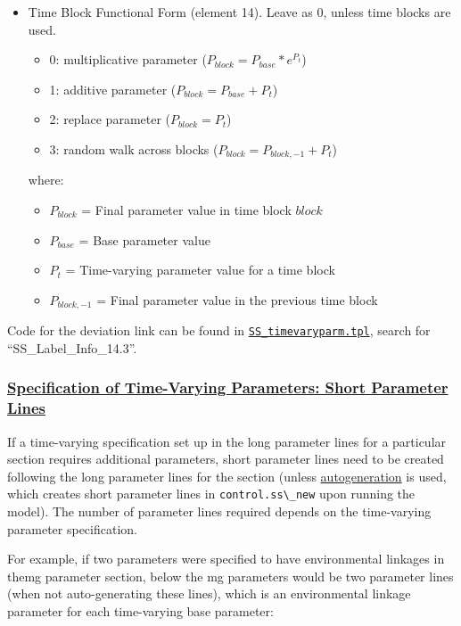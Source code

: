 \begin{itemize}
\item Time Block Functional Form (element 14). Leave as 0, unless time blocks are used.
	\begin{itemize}
		\item 0: multiplicative parameter ($P_{block} = P_{base}*e^{P_t}$)
		\item 1: additive parameter ($P_{block} = P_{base} + P_t$)
		\item 2: replace parameter ($P_{block} = P_t$)
		\item 3: random walk across blocks ($P_{block} = P_{block,-1} + P_t$)
	\end{itemize}
	where:
	\begin{itemize}
        \item $P_{block}$ = Final parameter value in time block $block$
        \item $P_{base}$ = Base parameter value
		\item $P_{t}$ = Time-varying parameter value for a time block
		\item $P_{block,-1}$ = Final parameter value in the previous time block
     \end{itemize}
\end{itemize}


Code for the deviation link can be found in \href{https://github.com/nmfs-ost/ss3-source-code/blob/main/SS_timevaryparm.tpl}{\texttt{SS\_timevaryparm.tpl}}, search for ``SS\_Label\_Info\_14.3''.

\hypertarget{SpecTVShort}{}
\subsubsection[Specification of Time-Varying Parameters: Short Parameter Lines]{\protect\hyperlink{SpecTVShort}{Specification of Time-Varying Parameters: Short Parameter Lines}}

If a time-varying specification set up in the long parameter lines for a particular section requires additional parameters, short parameter lines need to be created following the long parameter lines for the section (unless \hyperlink{autogen}{autogeneration} is used, which creates short parameter lines in \verb|control.ss\_new| upon running the model). The number of parameter lines required depends on the time-varying parameter specification.

For example, if two parameters were specified to have environmental linkages in the\gls{mg} parameter section, below the \gls{mg} parameters would be two parameter lines (when not auto-generating these lines), which is an environmental linkage parameter for each time-varying base parameter:

